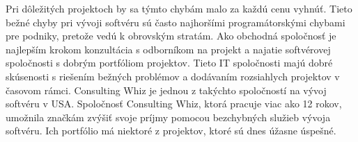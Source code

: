 \documentclass[10pt,twoside,slovak,a4paper]{article}
\begin{document}
Pri dôležitých projektoch by sa týmto chybám malo za každú cenu vyhnúť. Tieto bežné chyby pri vývoji softvéru sú často najhoršími programátorskými chybami pre podniky, pretože vedú k obrovským stratám. Ako obchodná spoločnosť je najlepším krokom konzultácia s odborníkom na projekt a najatie softvérovej spoločnosti s dobrým portfóliom projektov. Tieto IT spoločnosti majú dobré skúsenosti s riešením bežných problémov a dodávaním rozsiahlych projektov v časovom rámci. Consulting Whiz je jednou z takýchto spoločností na vývoj softvéru v USA. Spoločnosť Consulting Whiz, ktorá pracuje viac ako 12 rokov, umožnila značkám zvýšiť svoje príjmy pomocou bezchybných služieb vývoja softvéru. Ich portfólio má niektoré z projektov, ktoré sú dnes úžasne úspešné.



\nocite{*}		%

\end{document}
